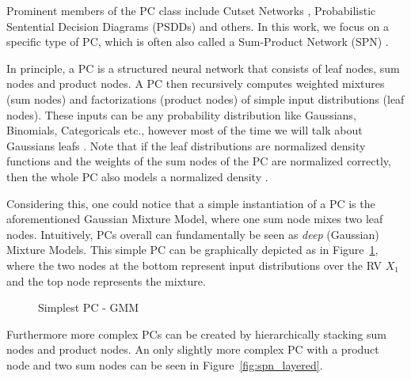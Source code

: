 Prominent members of the PC class include Cutset Networks \cite{cutset}, Probabilistic
Sentential Decision Diagrams (PSDDs) \cite{psdd} and others. In this work, we focus on a specific type of PC, which is often also called a Sum-Product Network (SPN) \cite{spn}.

In principle, a PC is a structured neural network that consists of leaf nodes, sum nodes and product 
nodes. A PC then recursively computes weighted mixtures (sum nodes) and factorizations (product nodes) of simple input distributions (leaf nodes). 
These inputs can be any probability distribution like Gaussians, Binomials, Categoricals etc.,
however most of the time we will talk about Gaussians leafs \cite{pc_intro}. Note that if the leaf distributions are normalized density functions and the weights of the sum nodes of the PC are
normalized correctly, then the whole PC also models a normalized density \cite{pc_intro}.

Considering this, one could notice that a simple instantiation of a PC is the aforementioned
Gaussian Mixture Model, where one sum node mixes two leaf nodes. Intuitively, PCs overall can fundamentally be seen as \emph{deep} (Gaussian) Mixture Models. 
This simple PC can be graphically depicted as in Figure~\ref{fig:spn_gmm}, where the two nodes at the bottom represent input distributions over the RV $X_1$ and the top node
represents the mixture.

\begin{figure}[h!]
    \centering
    \caption{Simplest PC - GMM}
    \label{fig:spn_gmm}
\end{figure}

Furthermore more complex PCs can be created by hierarchically stacking sum nodes and product nodes.
An only slightly more complex PC with a product node and two sum nodes can be seen in Figure~\ref{fig:spn_layered}. 

